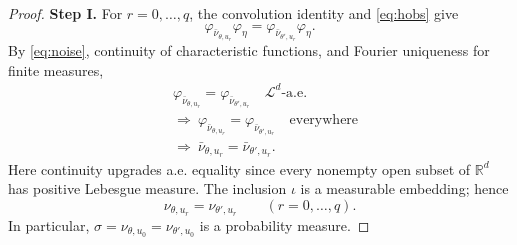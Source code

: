 \documentclass[11pt,a4paper]{article}
\newcommand{\R}{\mathbb R}
\newcommand{\aev}{\text{-a.e.}}
\newcommand{\Leb}{\mathcal L}
\begin{document}
\begin{proof}\mbox{}\par
\noindent\textbf{Step I.}
For $r=0,\ldots,q$, the convolution identity and \eqref{eq:hobs} give
\[
 \varphi_{\bar\nu_{\theta,u_r}}\varphi_\eta
 =\varphi_{\bar\nu_{\theta',u_r}}\varphi_\eta.
\]
By \eqref{eq:noise}, continuity of characteristic functions, and Fourier
uniqueness for finite measures,
\[
 \begin{aligned}
 &\varphi_{\bar\nu_{\theta,u_r}}
   =\varphi_{\bar\nu_{\theta',u_r}}\quad\Leb^d\aev\\
 &\Longrightarrow\
   \varphi_{\bar\nu_{\theta,u_r}}
   =\varphi_{\bar\nu_{\theta',u_r}}\quad\text{everywhere}\\
 &\Longrightarrow\ \bar\nu_{\theta,u_r}=\bar\nu_{\theta',u_r}.
 \end{aligned}
\]
Here continuity upgrades a.e. equality since every nonempty open subset
of $\R^d$ has positive Lebesgue measure.
The inclusion $\iota$ is a measurable embedding; hence
\begin{equation}
 \nu_{\theta,u_r}=\nu_{\theta',u_r}\qquad(r=0,\ldots,q).
 \label{eq:hlaw}
\end{equation}
In particular, $\sigma=\nu_{\theta,u_0}=\nu_{\theta',u_0}$ is a probability measure.


\end{proof}
\end{document}
